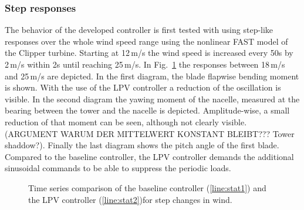 \documentclass[times]{weauth}
\begin{document}
\subsubsection*{Step responses}
The behavior of the developed controller is first tested with using step-like responses over
the whole wind speed range using the nonlinear FAST model of the Clipper turbine. 
Starting at 12\,m/s the wind speed is increased every 50s by 2\,m/s within 2s until reaching 25\,m/s.
In Fig.~\ref{fig:t_sim}	the responses between 18\,m/s and  25\,m/s are depicted. In the first diagram,
the blade flapwise bending moment is shown. With the use of the LPV controller a reduction of the oscillation
is visible. In the second diagram the yawing moment of the nacelle, measured at the bearing between the
tower and the nacelle is depicted. Amplitude-wise, a small reduction of that moment can be seen, although 
not clearly visible. (ARGUMENT WARUM DER MITTELWERT KONSTANT BLEIBT??? Tower shaddow?).
Finally the last diagram shows the pitch angle of the first blade. Compared to the baseline controller,
the LPV controller demands the additional sinusoidal commands to be able to suppress the periodic loads.
\begin{figure}[hbt]
	\centering
	
	\caption{Time series comparison of the baseline controller (\ref{line:stat1}) and the LPV controller (\ref{line:stat2})for step changes in wind.}
	\label{fig:t_sim}	
\end{figure}
\end{document}
